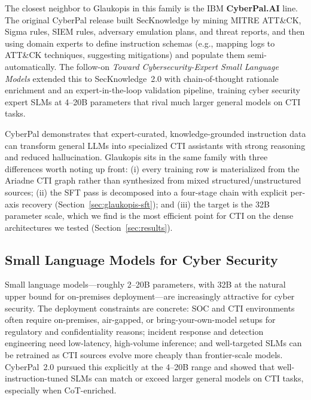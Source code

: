 \documentclass[conference]{IEEEtran}
\begin{document}
The closest neighbor to Glaukopis in this family is the IBM \textbf{CyberPal.AI} line. The original CyberPal release \cite{levi2024cyberpal} built SecKnowledge by mining MITRE ATT\&CK, Sigma rules, SIEM rules, adversary emulation plans, and threat reports, and then using domain experts to define instruction schemas (e.g., mapping logs to ATT\&CK techniques, suggesting mitigations) and populate them semi-automatically. The follow-on \emph{Toward Cybersecurity-Expert Small Language Models} \cite{levi2025toward} extended this to SecKnowledge~2.0 with chain-of-thought rationale enrichment and an expert-in-the-loop validation pipeline, training cyber security expert SLMs at 4--20B parameters that rival much larger general models on CTI tasks.

CyberPal demonstrates that expert-curated, knowledge-grounded instruction data can transform general LLMs into specialized CTI assistants with strong reasoning and reduced hallucination. Glaukopis sits in the same family with three differences worth noting up front: (i) every training row is materialized from the Ariadne CTI graph rather than synthesized from mixed structured/unstructured sources; (ii) the SFT pass is decomposed into a four-stage chain with explicit per-axis recovery (Section~\ref{sec:glaukopis-sft}); and (iii) the target is the 32B parameter scale, which we find is the most efficient point for CTI on the dense architectures we tested (Section~\ref{sec:results}).

\subsection{Small Language Models for Cyber Security}
\label{sec:ift-slm-cyber}

Small language models---roughly 2--20B parameters, with 32B at the natural upper bound for on-premises deployment---are increasingly attractive for cyber security. The deployment constraints are concrete: SOC and CTI environments often require on-premises, air-gapped, or bring-your-own-model setups for regulatory and confidentiality reasons; incident response and detection engineering need low-latency, high-volume inference; and well-targeted SLMs can be retrained as CTI sources evolve more cheaply than frontier-scale models. CyberPal~2.0 \cite{levi2025toward} pursued this explicitly at the 4--20B range and showed that well-instruction-tuned SLMs can match or exceed larger general models on CTI tasks, especially when CoT-enriched.
\end{document}

